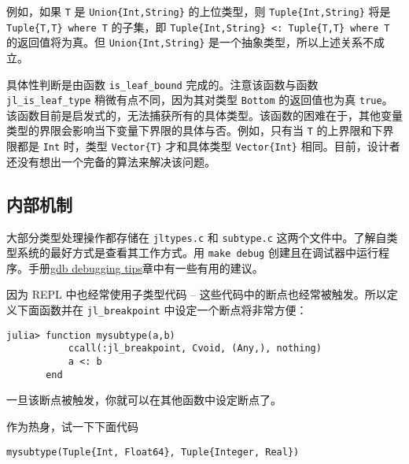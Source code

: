 例如，如果 \texttt{T} 是 \texttt{Union\{Int,String\}} 的上位类型，则 \texttt{Tuple\{Int,String\}} 将是 \texttt{Tuple\{T,T\} where T} 的子集，即 \texttt{Tuple\{Int,String\} <: Tuple\{T,T\} where T} 的返回值将为真。但 \texttt{Union\{Int,String\}} 是一个抽象类型，所以上述关系不成立。



具体性判断是由函数 \texttt{is\_leaf\_bound} 完成的。注意该函数与函数 \texttt{jl\_is\_leaf\_type} 稍微有点不同，因为其对类型 \texttt{Bottom} 的返回值也为真 \texttt{true}。该函数目前是启发式的，无法捕获所有的具体类型。该函数的困难在于，其他变量类型的界限会影响当下变量下界限的具体与否。例如，只有当 \texttt{T} 的上界限和下界限都是 \texttt{Int} 时，类型 \texttt{Vector\{T\}} 才和具体类型 \texttt{Vector\{Int\}} 相同。目前，设计者还没有想出一个完备的算法来解决该问题。



\hypertarget{17413862228343911094}{}


\subsection{内部机制}



大部分类型处理操作都存储在 \texttt{jltypes.c} 和 \texttt{subtype.c} 这两个文件中。了解自类型系统的最好方式是查看其工作方式。用 \texttt{make debug} 创建且在调试器中运行程序。手册\href{@ref}{gdb debugging tips}章中有一些有用的建议。



因为 REPL 中也经常使用子类型代码 – 这些代码中的断点也经常被触发。所以定义下面函数并在 \texttt{jl\_breakpoint} 中设定一个断点将非常方便：




\begin{verbatim}
julia> function mysubtype(a,b)
           ccall(:jl_breakpoint, Cvoid, (Any,), nothing)
           a <: b
       end
\end{verbatim}



一旦该断点被触发，你就可以在其他函数中设定断点了。



作为热身，试一下下面代码




\begin{verbatim}
mysubtype(Tuple{Int, Float64}, Tuple{Integer, Real})
\end{verbatim}



